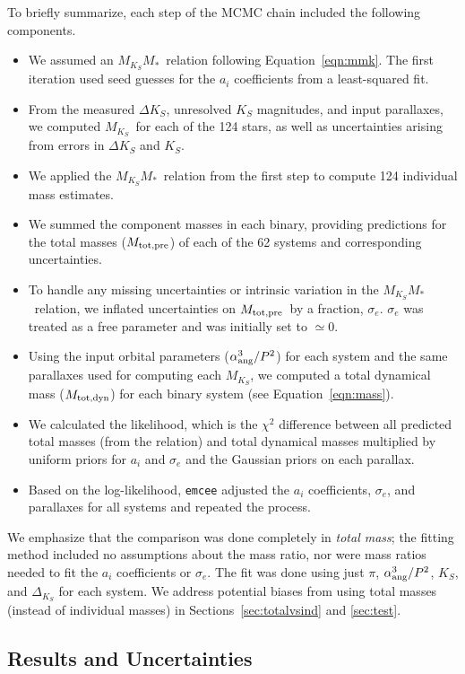 \documentclass[twocolumn]{aastex62}
\newcommand{\mks}{$M_{K_S}$}
\newcommand{\mmk}{$M_{K_S}$\textendash$M_*$}
\newcommand{\mpred}{$M_{\rm{tot,pre}}$}
\newcommand{\mdyn}{$M_{\rm{tot,dyn}}$}
\begin{document}
To briefly summarize, each step of the MCMC chain included the following components. 
\begin{itemize}
\item We assumed an \mmk\ relation following Equation~\ref{eqn:mmk}. The first iteration used seed guesses for the $a_i$ coefficients from a least-squared fit. 
\item From the measured $\Delta K_S$, unresolved $K_S$ magnitudes, and input parallaxes, we computed \mks\ for each of the 124 stars, as well as uncertainties arising from errors in $\Delta K_S$ and $K_S$.
\item We applied the \mmk\ relation from the first step to compute 124 individual mass estimates.
\item We summed the component masses in each binary, providing predictions for the total masses (\mpred) of each of the 62 systems and corresponding uncertainties.
\item To handle any missing uncertainties or intrinsic variation in the \mmk\ relation, we inflated uncertainties on \mpred\ by a fraction, $\sigma_e$. $\sigma_e$ was treated as a free parameter and was initially set to $\simeq$0. 
\item Using the input orbital parameters ($\alpha_{\rm{ang}}^3/P^2$) for each system and the same parallaxes used for computing each \mks, we computed a total dynamical mass (\mdyn) for each binary system (see Equation~\ref{eqn:mass}). 
\item We calculated the likelihood, which is the $\chi^2$ difference between all predicted total masses (from the relation) and total dynamical masses multiplied by uniform priors for $a_i$ and $\sigma_e$ and the Gaussian priors on each parallax.
\item Based on the log-likelihood, {\tt emcee} adjusted the $a_i$ coefficients, $\sigma_e$, and parallaxes for all systems and repeated the process.
\end{itemize}
We emphasize that the comparison was done completely in {\it total mass}; the fitting method included no assumptions about the mass ratio, nor were mass ratios needed to fit the $a_i$ coefficients or $\sigma_e$. The fit was done using just $\pi$, $\alpha_{\rm{ang}}^3/P^2$, $K_S$, and $\Delta_{K_S}$ for each system. We address potential biases from using total masses (instead of individual masses) in Sections~\ref{sec:totalvsind} and \ref{sec:test}.

\subsection{Results and Uncertainties}\label{sec:res}
\end{document}
